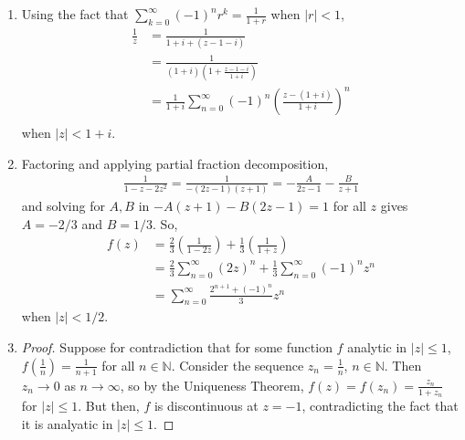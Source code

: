 \documentclass[11pt, letterpaper]{article}
\begin{document}
\thispagestyle{firststyle}


\begin{enumerate}
  \item Using the fact that $\sum_{k = 0}^\infty (-1)^n r^k = \frac{1}{1 + r}$ when $\vert r \vert < 1$,
  \begin{align*}
    \frac{1}{z} &= \frac{1}{1 + i + (z - 1 - i)} \\
    &= \frac{1}{(1 + i)(1 + \frac{z - 1 - i}{1 + i})} \\
    &= \frac{1}{1 + i} \sum_{n = 0}^\infty (-1)^n \left(\frac{z - (1 + i)}{1 + i}\right)^n \\
  \end{align*}
  when $\vert z \vert < 1 + i$.
  \item Factoring and applying partial fraction decomposition,
  \begin{align*}
    \frac{1}{1 - z - 2z^2} = \frac{1}{-(2z - 1)(z + 1)} = - \frac{A}{2z - 1} - \frac{B}{z + 1}
  \end{align*}
  and solving for $A, B$ in $-A(z + 1) - B(2z - 1) = 1$ for all $z$ gives $A = -2/3$ and $B = 1/3$.
  So, \begin{align*}
    f(z) &= \frac{2}{3} \left(\frac{1}{1 - 2z}\right) + \frac{1}{3} \left(\frac{1}{1 + z}\right) \\
    &= \frac{2}{3} \sum_{n = 0}^\infty (2z)^n + \frac{1}{3} \sum_{n = 0}^\infty (-1)^n z^n \\
    &= \sum_{n = 0}^\infty \frac{2^{n + 1} + (-1)^n}{3} z^n
  \end{align*}
  when $\vert z \vert < 1/2$.

  \item \begin{proof}
    Suppose for contradiction that for some function $f$ analytic in $\vert z \vert \leq 1$,
    $f(\frac{1}{n}) = \frac{1}{n + 1}$ for all $n \in \mathbb{N}$. Consider the sequence $z_n = \frac{1}{n}$, $n \in \mathbb N$.
    Then $z_n \to 0$ as $n \to \infty$, so by the Uniqueness Theorem, $f(z) = f(z_n) = \frac{z_n}{1 + z_n}$ for $\vert z \vert \leq 1$.
    But then, $f$ is discontinuous at $z = -1$, contradicting the fact that it is analyatic in $\vert z \vert \leq 1$.
  \end{proof}


\end{enumerate}
\end{document}
